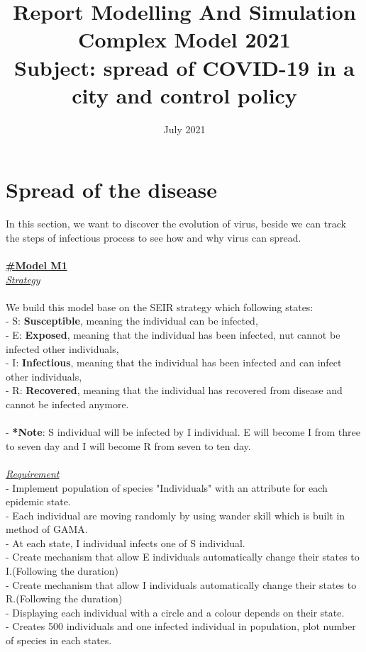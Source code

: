 \documentclass{article}
\title{Report Modelling And Simulation Complex Model 2021
        \linebreak
        \\Subject:  spread of COVID-19 in a city and control policy}
\date{July 2021}
\begin{document}
\newpage
\section{Spread of the disease}
In this section, we want to discover the evolution of virus, beside we can track the steps of infectious process to see how and why virus can spread.
\\
\\
\underline{\textbf{#Model M1}}
\\
\underline{\emph{Strategy}}\\\\
We build this model base on the SEIR strategy which following states:\\
- S: \textbf{Susceptible}, meaning the individual can be infected,\\
- E: \textbf{Exposed}, meaning that the individual has been infected, nut cannot be infected other individuals,\\
- I: \textbf{Infectious}, meaning that the individual has been infected and can infect other individuals,\\
- R: \textbf{Recovered}, meaning that the individual has recovered from disease and cannot be infected anymore.\\\\
- \textbf{*Note}: S individual will be infected by I individual. E will become I from three to seven day and I will become R from seven to ten day.
\\\\
\underline{\emph{Requirement}}\\
- Implement population of species "Individuals" with an attribute for each epidemic state.\\
- Each individual are moving randomly by using wander skill which is built in method of GAMA.\\ 
- At each state, I individual infects one of S individual.\\
- Create mechanism that allow E individuals automatically change their  states to I.(Following the duration)\\
- Create mechanism that allow I individuals automatically change their  states to R.(Following the duration)\\
- Displaying each individual with a circle and a colour depends on their state.\\
- Creates 500 individuals and one infected individual in population, plot number of species in each states.\\\\
\end{document}
